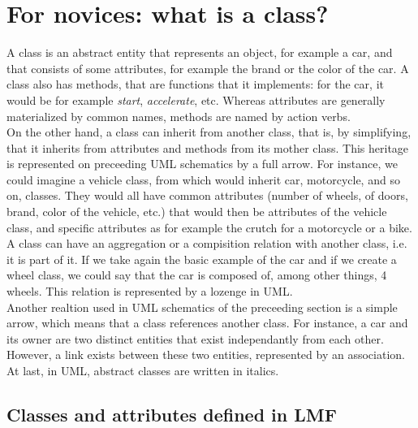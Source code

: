 \documentclass[a4paper,12pt]{article}
\begin{document}
\section{For novices: what is a class?}

A class is an abstract entity that represents an object, for example a car, and that consists of some attributes, for example the brand or the color of the car. A class also has methods, that are functions that it implements: for the car, it would be for example \textit{start}, \textit{accelerate}, etc. Whereas attributes are generally materialized by common names, methods are named by action verbs.\\
On the other hand, a class can inherit from another class, that is, by simplifying, that it inherits from attributes and methods from its mother class. This heritage is represented on preceeding UML schematics by a full arrow. For instance, we could imagine a vehicle class, from which would inherit car, motorcycle, and so on, classes. They would all have common attributes (number of wheels, of doors, brand, color of the vehicle, etc.) that would then be attributes of the vehicle class, and specific attributes as for example the crutch for a motorcycle or a bike.\\
A class can have an aggregation or a compisition relation with another class, i.e. it is part of it. If we take again the basic example of the car and if we create a wheel class, we could say that the car is composed of, among other things, 4 wheels. This relation is represented by a lozenge in UML.\\
Another realtion used in UML schematics of the preceeding section is a simple arrow, which means that a class references another class. For instance, a car and its owner are two distinct entities that exist independantly from each other. However, a link exists between these two entities, represented by an association.\\
At last, in UML, abstract classes are written in italics.

\subsection{Classes and attributes defined in LMF}
\end{document}
